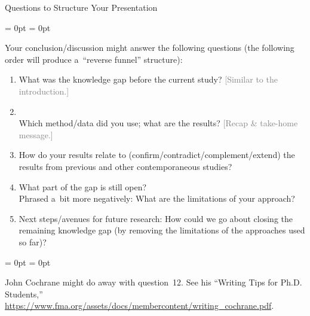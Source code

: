 \documentclass[aspectratio = 169, t, 10pt]{beamer}
\begin{document}
\begin{frame}[allowframebreaks]{Questions to Structure Your Presentation}
\begin{list}{}{\leftmargin = 0pt \itemindent = 0pt}
	\item Your conclusion/discussion might answer the following questions (the following order will produce a~``reverse funnel'' structure):
\end{list}
\begin{enumerate}
	\item[8.] What was the knowledge gap before the current study? \textcolor{gray}{[Similar to the introduction.]}
	\item[9.]  \\
		Which method\slash data did you use; what are the results? \textcolor{gray}{[Recap \& take-home message.]}
	\item[10.] How do your results relate to (confirm\slash contradict\slash complement\slash extend) the results from previous and other contemporaneous studies?
	\item[11.] What part of the gap is still open? \\
		Phrased a~bit more negatively: What are the limitations of your approach?
	\item[12.] Next steps\slash avenues for future research: How could we go about closing the remaining knowledge gap (by removing the limitations of the approaches used so far)?
\end{enumerate}
\egroup

\begin{list}{}{\leftmargin = 0pt \itemindent = 0pt}
	\item John Cochrane might do away with question~12. See his ``Writing Tips for Ph.D. Students,'' \url{https://www.fma.org/assets/docs/membercontent/writing_cochrane.pdf}.
\end{list}

\end{frame}
\end{document}
